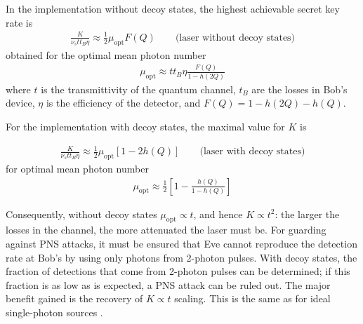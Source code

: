 \documentclass[paper=a4, fontsize=11pt]{scrartcl} %
\numberwithin{equation}{section} %
\numberwithin{figure}{section} %
\numberwithin{table}{section} %
\begin{document}
In the implementation without decoy states, the highest achievable secret key rate is
\begin{align}
	\frac{K}{\nu_s t t_B \eta}
	\approx
	\frac{1}{2}
	\mu_{\mathrm{opt}} F(Q)
	\qquad
	\text{(laser without decoy states)}
\end{align}
obtained for the optimal mean photon number
\begin{align}
	\mu_{\mathrm{opt}}
	\approx
	t t_B \eta
	\frac{F(Q)}{1-h(2Q)}
\end{align}
where $t$ is the transmittivity of the quantum channel, $t_B$ are the losses in Bob's
device, $\eta$ is the efficiency of the detector, and $F(Q) = 1 - h(2Q) - h(Q)$.

For the implementation with decoy states, the maximal value for $K$ is

\begin{align}
	\frac{K}{\nu_s t t_B \eta}
	\approx
	\frac{1}{2}
	\mu_{\mathrm{opt}}
	\left[1-2h(Q)\right]
	\qquad
	\text{(laser with decoy states)}
\end{align}
for optimal mean photon number
\begin{align}
	\mu_{\mathrm{opt}}
	\approx
	\frac{1}{2}
	\left[
	1 - \frac{h(Q)}{1-h(Q)}
	\right]
\end{align}

Consequently, without decoy states $\mu_{\mathrm{opt}} \propto t$, and hence
$K \propto t^2$: the larger the losses in the channel, the more attenuated the laser
must be. For guarding against PNS attacks, it must be ensured that Eve cannot reproduce
the detection rate at Bob's by using only photons from 2-photon pulses. With decoy states,
the fraction of detections that come from 2-photon pulses can be determined; if this fraction
is as low as is expected, a PNS attack can be ruled out. The major benefit gained is the recovery
of $K \propto t$ scaling. This is the same as for ideal single-photon sources \citep{lo2005, reviewScariani}.





\clearpage
\printnoidxglossaries
\end{document}
